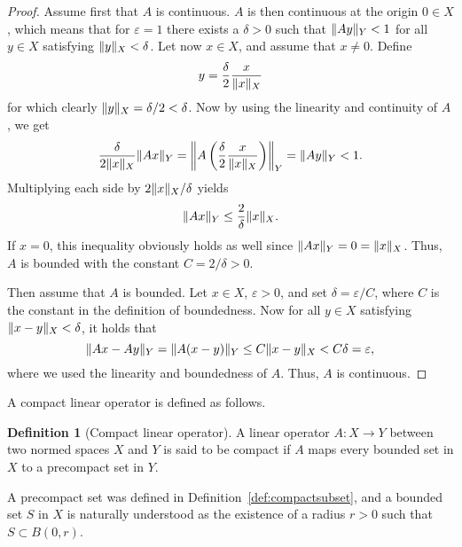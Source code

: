 \documentclass[english, 12pt, a4paper, sci, utf8, a-2b, online]{aaltothesis}
\theoremstyle{definition}
\newtheorem{definition}{Definition}[section]
\theoremstyle{plain}
\DeclarePairedDelimiter\norm{\lVert}{\rVert}
\numberwithin{equation}{section}
\begin{document}
\begin{proof}
    Assume first that $A$ is continuous.
    $A$ is then continuous at the origin $0 \in X$, which
    means that for $\varepsilon=1$ there exists a $\delta > 0$ such that
    $\norm{Ay}_Y < 1$ for all $y \in X$ satisfying
    $\norm{y}_X < \delta$.
    Let now $x \in  X$, and assume that $x \neq 0$. Define
    \begin{equation*}
        y = \frac{\delta}{2} \frac{x}{\norm{x}_X}
    \end{equation*}
    for which clearly $\norm{y}_X = \delta/2 < \delta$.
    Now by using the linearity and continuity of $A$, we get
    \begin{equation*}
        \frac{\delta}{2 \norm{x}_X} \norm{Ax}_Y
        = \norm*{A\left( \frac{\delta}{2} \frac{x}{\norm{x}_X} \right)}_Y
        = \norm{Ay}_Y
        < 1.
    \end{equation*}
    Multiplying each side by $2 \norm{x}_X / \delta$ yields
    \begin{equation*}
        \norm{Ax}_Y \leq \frac{2}{\delta} \norm{x}_X.
    \end{equation*}
    If $x=0$, this inequality
    obviously holds as well since $\norm{Ax}_Y = 0 =\norm{x}_X$. Thus,
    $A$ is bounded with the constant $C = 2/\delta > 0$.

    Then assume that $A$ is bounded.
    Let $x \in X$, $\varepsilon > 0$, and set $\delta = \varepsilon / C$,
    where $C$ is the constant in the definition of boundedness. Now
    for all $y \in X$ satisfying $\norm{x-y}_X < \delta$, it holds that
    \begin{equation*}
        \norm{Ax - Ay}_Y
        = \norm{A(x-y)}_Y
        \leq C \norm{x-y}_X
        < C \delta
        = \varepsilon,
    \end{equation*}
    where we used the linearity and boundedness of $A$. Thus, $A$ is continuous.
\end{proof}

A compact linear operator is defined as follows.
\begin{definition}[Compact linear operator]
    \label{def:compactoperator}
    A linear operator $A: X \to Y$ between two normed spaces $X$ and $Y$
    is said to be compact if $A$ maps every bounded set in $X$ to
    a precompact set in $Y$.
\end{definition}
A precompact set was defined in Definition~\ref{def:compactsubset},
and a bounded set $S$ in $X$ is naturally understood as the existence of a radius $r > 0$
such that $S \subset B(0,r)$.
\end{document}
